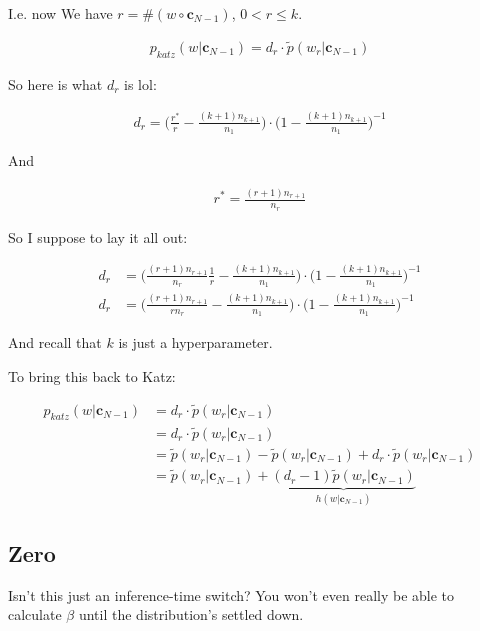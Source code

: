 \documentclass{article}
\newcommand{\context}{\boldsymbol{c}}
\begin{document}
		I.e. now We have $r = \#(w\circ\context_{N-1})$, $0<r\le k$.
		
		\begin{align}
			p_{katz}(w|\context_{N-1}) = d_r \cdot \tilde{p}(w_r|\context_{N-1})
		\end{align}
		
		So here is what $d_r$ is lol:
		
		\begin{align}
			d_r = \bigg(\frac{r^*}{r} - \frac{(k+1)n_{k+1}}{n_1} \bigg)\cdot \bigg(1 - \frac{(k+1)n_{k+1}}{n_1} \bigg)^{-1}
		\end{align}
		
		And
		
		\begin{align}
			r^* = \frac{(r+1)n_{r+1}}{n_r}
		\end{align}
		
		So I suppose to lay it all out:
	
		\begin{align}
			d_r &= \bigg( \frac{(r+1)n_{r+1}}{n_r}\frac{1}{r} - \frac{(k+1)n_{k+1}}{n_1} \bigg)\cdot \bigg(1 - \frac{(k+1)n_{k+1}}{n_1} \bigg)^{-1}\\
			d_r &= \bigg( \frac{(r+1)n_{r+1}}{r n_r} - \frac{(k+1)n_{k+1}}{n_1} \bigg)\cdot \bigg(1 - \frac{(k+1)n_{k+1}}{n_1} \bigg)^{-1}
		\end{align}
		
		And recall that $k$ is just a hyperparameter.
		
		To bring this back to Katz:
		
		\begin{align}
			p_{katz}(w|\context_{N-1}) &= d_r \cdot \tilde{p}(w_r|\context_{N-1})\\
			&= d_r \cdot \tilde{p}(w_r|\context_{N-1})\\
			&= \tilde{p}(w_r|\context_{N-1}) - \tilde{p}(w_r|\context_{N-1}) + d_r \cdot \tilde{p}(w_r|\context_{N-1})\\
			&= \tilde{p}(w_r|\context_{N-1}) + \underbrace{(d_r-1)\tilde{p}(w_r|\context_{N-1})}_{h(w|\context_{N-1})}
		\end{align}
		
	\subsection{Zero}
	
		Isn't this just an inference-time switch? You won't even really be able to calculate $\beta$ until the distribution's settled down. 
		
\end{document}
